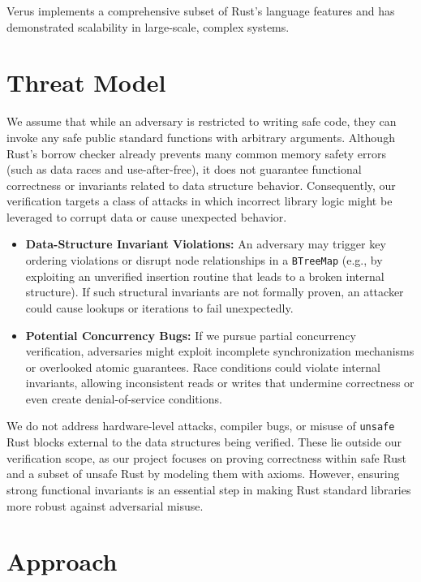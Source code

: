 \documentclass[conference]{IEEEtran}
\begin{document}
Verus implements a comprehensive subset of Rust's language features and has demonstrated scalability in large-scale, complex systems\cite{verus_publications}.

\section{Threat Model}
We assume that while an adversary is restricted to writing safe code, they can invoke any safe public standard functions with arbitrary arguments. Although Rust's borrow checker already prevents many common memory safety errors (such as data races and use-after-free), it does not guarantee functional correctness or invariants related to data structure behavior. Consequently, our verification targets a class of attacks in which incorrect library logic might be leveraged to corrupt data or cause unexpected behavior.

\begin{itemize}
\item \textbf{Data-Structure Invariant Violations:} An adversary may trigger key ordering violations or disrupt node relationships in a \texttt{BTreeMap} (e.g., by exploiting an unverified insertion routine that leads to a broken internal structure). If such structural invariants are not formally proven, an attacker could cause lookups or iterations to fail unexpectedly.
\item \textbf{Potential Concurrency Bugs:} If we pursue partial concurrency verification, adversaries might exploit incomplete synchronization mechanisms or overlooked atomic guarantees. Race conditions could violate internal invariants, allowing inconsistent reads or writes that undermine correctness or even create denial-of-service conditions.
\end{itemize}

We do not address hardware-level attacks, compiler bugs, or misuse of \texttt{unsafe} Rust blocks external to the data structures being verified. These lie outside our verification scope, as our project focuses on proving correctness within safe Rust and a subset of unsafe Rust by modeling them with axioms. However, ensuring strong functional invariants is an essential step in making Rust standard libraries more robust against adversarial misuse.

\section{Approach}
\end{document}
